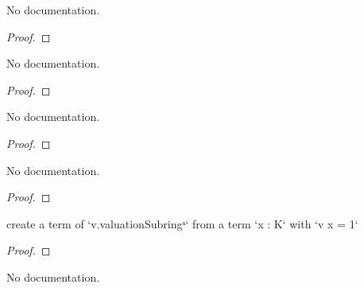 \begin{lemma}\label{eq_one_of_eq_one_of_le_one_le_one}
        \leanok
                No documentation.
    \end{lemma}

\begin{proof}
    \leanok
\end{proof}

\begin{theorem}\label{map_zpow}
        \leanok
                No documentation.
    \end{theorem}

\begin{proof}
    \leanok
\end{proof}

\begin{theorem}\label{val_valuationSubring_unit}
        \leanok
                No documentation.
    \end{theorem}

\begin{proof}
    \leanok
\end{proof}

\begin{theorem}\label{isUnit_in_valuationSubring_of_val_eq_one}
        \leanok
                No documentation.
    \end{theorem}

\begin{proof}
    \leanok
\end{proof}

\begin{theorem}\label{unitOfValOne_elem}
        \leanok
                create a term of `v.valuationSubringˣ` from a term `x : K` with `v x = 1`
    \end{theorem}

\begin{proof}
    \leanok
\end{proof}

\begin{theorem}\label{val_unitOfValOne_eq_one}
        \leanok
                No documentation.
    \end{theorem}

